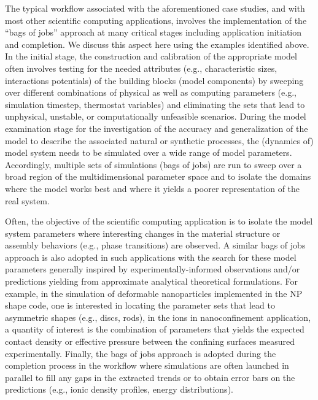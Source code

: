 The typical workflow associated with the aforementioned case studies, and with most other scientific computing applications, involves the implementation of the ``bags of jobs'' approach at many critical stages including application initiation and completion. We discuss this aspect here using the examples identified above. In the initial stage, the construction and calibration of the appropriate model often involves testing for the needed attributes (e.g., characteristic sizes, interactions potentials) of the building blocks (model components) by sweeping over different combinations of physical as well as computing parameters (e.g., simulation timestep, thermostat variables) and eliminating the sets that lead to unphysical, unstable, or computationally unfeasible scenarios. During the model examination stage for the investigation of the accuracy and generalization of the model to describe the associated natural or synthetic processes, the (dynamics of) model system needs to be simulated over a wide range of model parameters. Accordingly, multiple sets of simulations (bags of jobs) are run to sweep over a broad region of the multidimensional parameter space and to isolate the domains where the model works best and where it yields a poorer representation of the real system. 

Often, the objective of the scientific computing application is to isolate the model system parameters where interesting changes in the material structure or assembly behaviors (e.g., phase transitions) are observed. A similar bags of jobs approach is also  adopted in such applications with the search for these model parameters generally inspired by experimentally-informed observations and/or predictions yielding from approximate analytical theoretical formulations. For example, in the simulation of deformable nanoparticles implemented in the NP shape code, one is interested in locating the parameter sets that lead to asymmetric shapes (e.g., discs, rods), in the ions in nanoconfinement application, a quantity of interest is the combination of parameters that yields the expected contact density or effective pressure between the confining surfaces measured experimentally. Finally, the bags of jobs approach is adopted during the completion process in the workflow where simulations are often launched in parallel to fill any gaps in the extracted trends or to obtain error bars on the predictions (e.g., ionic density profiles, energy distributions).


\begin{comment}

- sweep, to get parameter set suitable
- important part of workflow
- exploring 
- ML ICCS application, training the ML model, new trend
- critical to develop ML wrappers for simulations on HPC
- ML IJHPCA

\end{comment}


